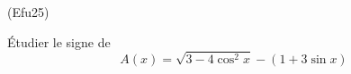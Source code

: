 \begin{tiny}(Efu25)\end{tiny} \'Etudier le signe de
\begin{displaymath}
  A(x) = \sqrt{3-4\cos^2 x} - \left( 1+3\sin x\right) 
\end{displaymath}
